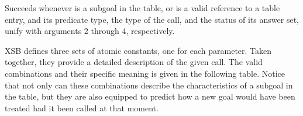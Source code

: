 \begin{description}


\vspace{-5ex}

%
Succeeds whenever  is a subgoal in the table, or
 is a valid reference to a table entry, and its
predicate type, the type of the call, and the status of its answer
set, unify with arguments 2 through 4, respectively.

XSB defines three sets of atomic constants, one for each parameter.
Taken together, they provide a detailed description of the given call.
The valid combinations and their specific meaning is given in the
following table.  Notice that not only can these combinations describe
the characteristics of a subgoal in the table, but they are also
equipped to predict how a new goal would have been treated had it been
called at that moment.


\end{description}
